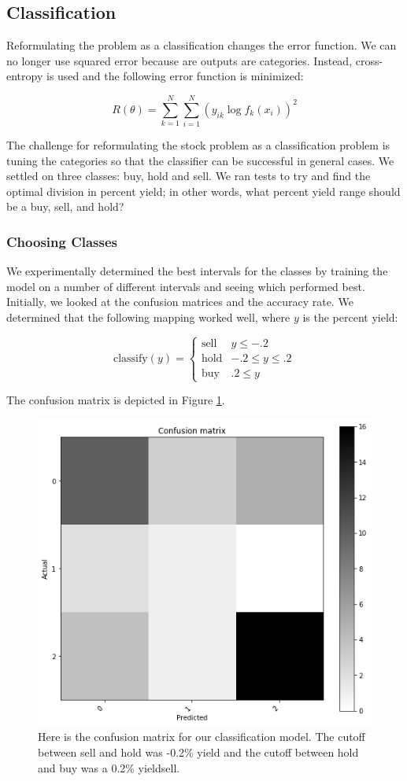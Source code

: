 \documentclass[12pt]{article}
\begin{document}
\subsection{Classification}
Reformulating the problem as a classification changes the error function. We can no longer use squared error because are outputs are categories. Instead, cross-entropy is used and the following error function is minimized: 

$$R(\theta) = \sum_{k=1}^{N} \sum_{i=1}^{N} (y_{ik} \log f_k(x_i))^2$$ 

The challenge for reformulating the stock problem as a classification problem is tuning the categories so that the classifier can be successful in general cases. We settled on three classes: buy, hold and sell. We ran tests to try and find the optimal division in percent yield; in other words, what percent yield range should be a buy, sell, and hold?

\subsubsection{Choosing Classes}
We experimentally determined the best intervals for the classes by training the model on a number of different intervals and seeing which performed best. Initially, we looked at the confusion matrices and the accuracy rate. We determined that the following mapping worked well, where $y$ is the percent yield: 

\[ \text{classify}(y) = \begin{cases} 
\text{sell} & y\leq -.2 \\
\text{hold} & -.2\leq y\leq .2 \\
\text{buy} & .2\leq y 
\end{cases}
\]

The confusion matrix is depicted in Figure \ref{confusion}.

\begin{figure}
	\centering
	\includegraphics[width=.5\linewidth]{confusion.png}
	\caption{Here is the confusion matrix for our classification model. The cutoff between sell and hold was -0.2\% yield and the cutoff between hold and buy was a 0.2\% yieldsell.}
	\label{confusion}
\end{figure}
\end{document}

